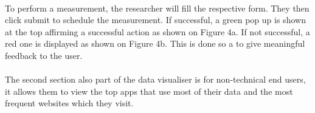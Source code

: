 \paragraph{}
To perform a measurement, the researcher will fill the respective form. They then click submit to schedule the measurement. If successful, a green pop up is shown at the top affirming a successful action as shown on Figure 4a. If not successful, a red one is displayed as shown on Figure 4b. This is done so a to give meaningful feedback to the user\cite{Shneiderman:2016:DUI:3033040}.
\paragraph{}
The second section also part of the data visualiser is for non-technical end users, it allows them to view the top apps that use most of their data and the most frequent websites which they visit.


